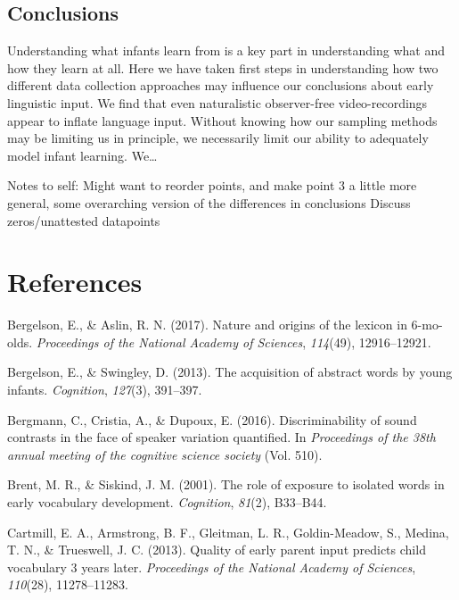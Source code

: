\documentclass[floatsintext,man]{apa6}
\theoremstyle{definition}
\theoremstyle{definition}
\theoremstyle{definition}
\theoremstyle{remark}
\begin{document}
\hypertarget{conclusions}{%
\subsection{Conclusions}\label{conclusions}}

Understanding what infants learn from is a key part in understanding
what and how they learn at all. Here we have taken first steps in
understanding how two different data collection approaches may influence
our conclusions about early linguistic input. We find that even
naturalistic observer-free video-recordings appear to inflate language
input. Without knowing how our sampling methods may be limiting us in
principle, we necessarily limit our ability to adequately model infant
learning. We\ldots{}

Notes to self: Might want to reorder points, and make point 3 a little
more general, some overarching version of the differences in conclusions
Discuss zeros/unattested datapoints

\newpage

\hypertarget{references}{%
\section{References}\label{references}}

\setlength{\parindent}{-0.5in}\setlength{\leftskip}{0.5in}

\hypertarget{refs}{}
\leavevmode\hypertarget{ref-bergelson2017nature}{}%
Bergelson, E., \& Aslin, R. N. (2017). Nature and origins of the lexicon
in 6-mo-olds. \emph{Proceedings of the National Academy of Sciences},
\emph{114}(49), 12916--12921.

\leavevmode\hypertarget{ref-bergelson2013acquisition}{}%
Bergelson, E., \& Swingley, D. (2013). The acquisition of abstract words
by young infants. \emph{Cognition}, \emph{127}(3), 391--397.

\leavevmode\hypertarget{ref-bergmann2016discriminability}{}%
Bergmann, C., Cristia, A., \& Dupoux, E. (2016). Discriminability of
sound contrasts in the face of speaker variation quantified. In
\emph{Proceedings of the 38th annual meeting of the cognitive science
society} (Vol. 510).

\leavevmode\hypertarget{ref-brent2001role}{}%
Brent, M. R., \& Siskind, J. M. (2001). The role of exposure to isolated
words in early vocabulary development. \emph{Cognition}, \emph{81}(2),
B33--B44.

\leavevmode\hypertarget{ref-cartmill2013quality}{}%
Cartmill, E. A., Armstrong, B. F., Gleitman, L. R., Goldin-Meadow, S.,
Medina, T. N., \& Trueswell, J. C. (2013). Quality of early parent input
predicts child vocabulary 3 years later. \emph{Proceedings of the
National Academy of Sciences}, \emph{110}(28), 11278--11283.
\end{document}
